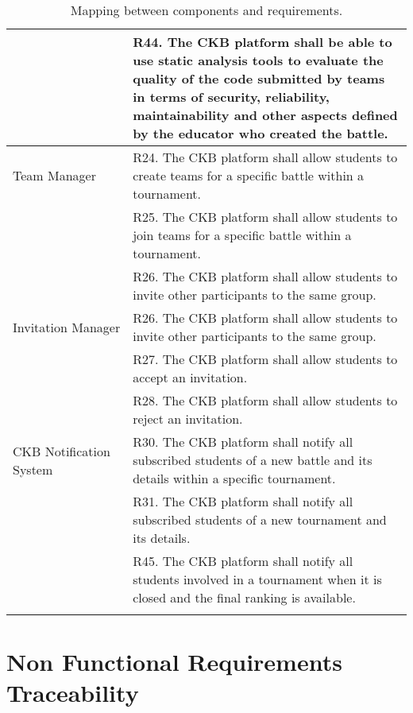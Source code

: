 \begin{center}
\begin{longtable}{p{0.3\linewidth}p{0.7\linewidth}}
        & R44. The CKB platform shall be able to use static analysis tools to evaluate the quality of the code submitted by teams in terms of security, reliability, maintainability and other aspects defined by the educator who created the battle. \\
        \hline
        Team Manager & R24. The CKB platform shall allow students to create teams for a specific battle within a tournament. \\
        & R25. The CKB platform shall allow students to join teams for a specific battle within a tournament. \\
        & R26. The CKB platform shall allow students to invite other participants to the same group. \\
        \hline
        Invitation Manager & R26. The CKB platform shall allow students to invite other participants to the same group. \\
        & R27. The CKB platform shall allow students to accept an invitation. \\
        & R28. The CKB platform shall allow students to reject an invitation. \\
        \hline
        CKB Notification System & R30. The CKB platform shall notify all subscribed students of a new battle and its details within a specific tournament. \\
        & R31. The CKB platform shall notify all subscribed students of a new tournament and its details. \\
        & R45. The CKB platform shall notify all students involved in a tournament when it is closed and the final ranking is available. \\
        \hline
        \caption{Mapping between components and requirements.}
        \label{tab: map_comp_req}%
    \end{longtable}
\end{center}

\newpage


\section{Non Functional Requirements Traceability}
\label{sec: non_functional_requirements_traceability}%

